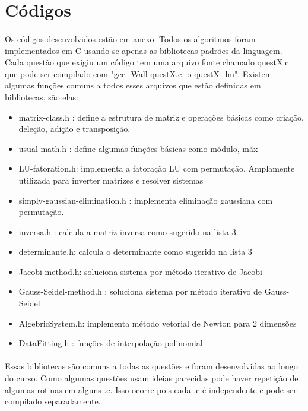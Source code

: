\section{Códigos}

\paragraph{}Os códigos desenvolvidos estão em anexo. Todos os algoritmos foram
implementados em C usando-se apenas as bibliotecas padrões da linguagem. 
Cada questão que exigiu um código tem uma arquivo fonte chamado questX.c que pode
ser compilado com "gcc -Wall questX.c -o questX -lm". Existem algumas funções comuns
a todos esses arquivos que estão definidas em bibliotecas, são elas:
\begin{itemize}
  \item matrix-class.h : define a estrutura de matriz e operações
  básicas como criação, deleção, adição e transposição.
  \item usual-math.h : define algumas funções básicas como módulo, máx
  \item LU-fatoration.h: implementa a fatoração LU com permutação. Amplamente
  utilizada para inverter matrizes e resolver sistemas
  \item simply-gaussian-elimination.h : implementa eliminação gaussiana com permutação.
  \item inversa.h : calcula a matriz inversa como sugerido na lista 3.
  \item determinante.h: calcula o determinante como sugerido na lista 3  
  \item Jacobi-method.h: soluciona sistema por método iterativo de Jacobi
  \item Gauss-Seidel-method.h : soluciona sistema por método iterativo de Gauss-Seidel
  \item AlgebricSystem.h: implementa método vetorial de Newton para 2 dimensões
  \item DataFitting.h : funções de interpolação polinomial 
\end{itemize}

\paragraph{}Essas bibliotecas são comuns a todas as questões e foram desenvolvidas
ao longo do curso. Como algumas questões usam ideias parecidas pode haver repetição
de algumas rotinas em alguns .c. Isso ocorre pois cada .c é independente e pode
ser compilado separadamente.
